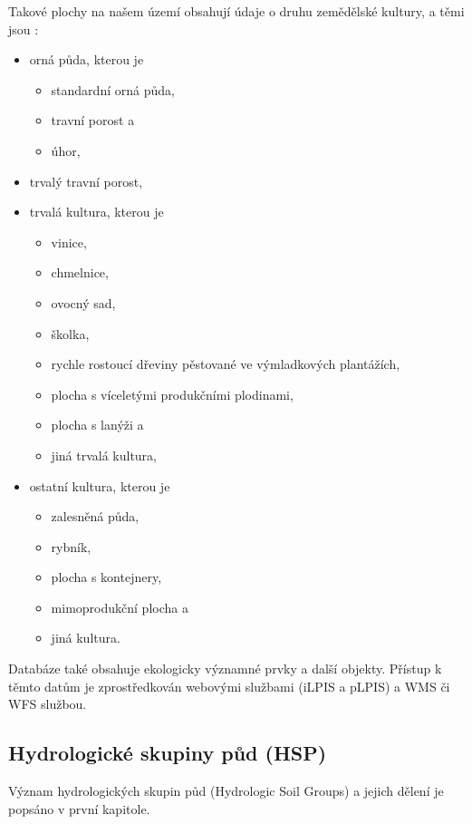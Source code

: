 \documentclass[a4paper,oneside,12pt]{book}
\begin{document}
Takové plochy na našem území obsahují údaje o druhu zemědělské kultury, a těmi jsou \cite{sSYEwLE0rNKoWGYk}:
\begin{itemize}
    \item orná půda, kterou je
    \begin{itemize}
        \item standardní orná půda,
        \item travní porost a
        \item úhor,
    \end{itemize}
    \item trvalý travní porost,
    \item trvalá kultura, kterou je
    \begin{itemize}
        \item vinice,
        \item chmelnice,
        \item ovocný sad,
        \item školka,
        \item rychle rostoucí dřeviny pěstované ve výmladkových plantážích,
        \item plocha s víceletými produkčními plodinami,
        \item plocha s lanýži a
        \item jiná trvalá kultura, 
    \end{itemize}
    \item ostatní kultura, kterou je
    \begin{itemize}
        \item zalesněná půda,
        \item rybník,
        \item plocha s kontejnery,
        \item mimoprodukční plocha a
        \item jiná kultura.
    \end{itemize}
\end{itemize}

\hspace{10mm} Databáze také obsahuje ekologicky významné prvky a další objekty. \cite{sSYEwLE0rNKoWGYk}
Přístup k těmto datům je zprostředkován webovými službami (iLPIS a pLPIS)  a WMS či WFS službou. \cite{Devaty2018}

\subsection{Hydrologické skupiny půd (HSP)} \label{hsp}
\hspace{10mm}Význam hydrologických skupin půd (Hydrologic Soil Groups) a jejich dělení je popsáno v první kapitole. 
\end{document}
